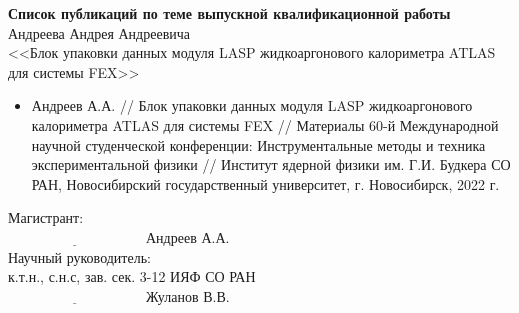 \documentclass[a4paper, 14pt]{extarticle}
\begin{document}
\thispagestyle{empty}
\begin{center}
    \textbf{Список публикаций по теме выпускной квалификационной работы}\\
    Андреева Андрея Андреевича\\
    <<Блок упаковки данных модуля LASP жидкоаргонового калориметра ATLAS для системы FEX>>
\end{center}
\par
\begin{itemize}
    \item Андреев А.А. // Блок упаковки данных модуля LASP жидкоаргонового калориметра ATLAS для системы FEX // Материалы 60-й Международной научной студенческой конференции: Инструментальные методы и техника экспериментальной физики // Институт ядерной физики им. Г.И. Будкера СО РАН, Новосибирский государственный университет, г. Новосибирск, 2022 г.
\end{itemize}


\noindent
\begin{flushright}
Магистрант:\\
$\underline{\hspace{4cm}}$ Андреев А.А.\\
Научный руководитель:\\
к.т.н., с.н.с, зав. сек. 3-12 ИЯФ СО РАН\\
$\underline{\hspace{4cm}}$ Жуланов В.В.\\
\end{flushright}
\end{document}
